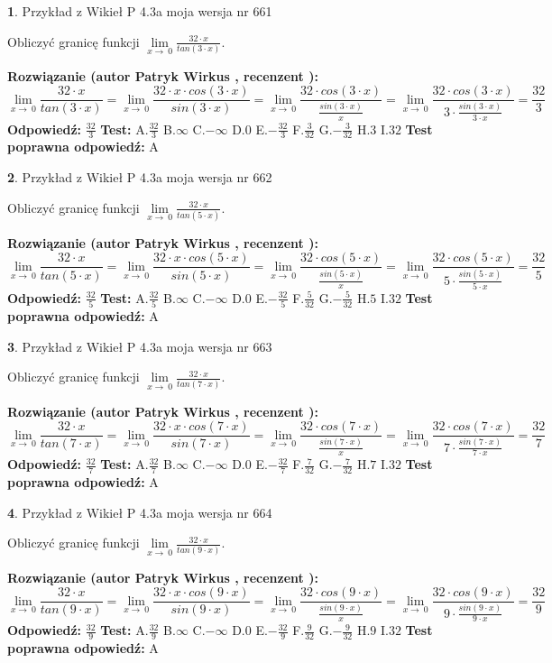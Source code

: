 \documentclass[12pt, a4paper]{article}
\theoremstyle{definition} %
\newtheorem{zad}{}
\newcommand{\zadStart}[1]{\begin{zad}#1\newline}
\newcommand{\zadStop}{\end{zad}}
\newcommand{\rozwStart}[2]{\noindent \textbf{Rozwiązanie (autor #1 , recenzent #2): }\newline}
\newcommand{\rozwStop}{\newline}
\newcommand{\odpStart}{\noindent \textbf{Odpowiedź:}\newline}
\newcommand{\odpStop}{\newline}
\newcommand{\testStart}{\noindent \textbf{Test:}\newline}
\newcommand{\testStop}{\newline}
\newcommand{\kluczStart}{\noindent \textbf{Test poprawna odpowiedź:}\newline}
\newcommand{\kluczStop}{\newline}
\begin{document}
\zadStart{Przykład z Wikieł P 4.3a moja wersja nr 661}


Obliczyć granicę funkcji $\lim\limits_{x\to\ 0}\frac{32 \cdot x}{tan(3 \cdot x)}$.
\zadStop
\rozwStart{Patryk Wirkus}{}
$$\lim\limits_{x\to\ 0}\frac{32 \cdot x}{tan(3 \cdot x)}=\lim\limits_{x\to\ 0}\frac{32 \cdot x \cdot cos(3 \cdot x)}{sin(3 \cdot x)}=\lim\limits_{x\to\ 0}\frac{32 \cdot cos(3 \cdot x)}{\frac{sin(3 \cdot x)}{x}}=\lim\limits_{x\to\ 0}\frac{32 \cdot cos(3 \cdot x)}{3 \cdot \frac{sin(3 \cdot x)}{3 \cdot x}} = \frac{32}{3}$$
\rozwStop
\odpStart
$\frac{32}{3}$
\odpStop
\testStart
A.$\frac{32}{3}$
B.$\infty$
C.$-\infty$
D.$0$
E.$-\frac{32}{3}$
F.$\frac{3}{32}$
G.$-\frac{3}{32}$
H.$3$
I.$32$
\testStop
\kluczStart
A
\kluczStop



\zadStart{Przykład z Wikieł P 4.3a moja wersja nr 662}


Obliczyć granicę funkcji $\lim\limits_{x\to\ 0}\frac{32 \cdot x}{tan(5 \cdot x)}$.
\zadStop
\rozwStart{Patryk Wirkus}{}
$$\lim\limits_{x\to\ 0}\frac{32 \cdot x}{tan(5 \cdot x)}=\lim\limits_{x\to\ 0}\frac{32 \cdot x \cdot cos(5 \cdot x)}{sin(5 \cdot x)}=\lim\limits_{x\to\ 0}\frac{32 \cdot cos(5 \cdot x)}{\frac{sin(5 \cdot x)}{x}}=\lim\limits_{x\to\ 0}\frac{32 \cdot cos(5 \cdot x)}{5 \cdot \frac{sin(5 \cdot x)}{5 \cdot x}} = \frac{32}{5}$$
\rozwStop
\odpStart
$\frac{32}{5}$
\odpStop
\testStart
A.$\frac{32}{5}$
B.$\infty$
C.$-\infty$
D.$0$
E.$-\frac{32}{5}$
F.$\frac{5}{32}$
G.$-\frac{5}{32}$
H.$5$
I.$32$
\testStop
\kluczStart
A
\kluczStop



\zadStart{Przykład z Wikieł P 4.3a moja wersja nr 663}


Obliczyć granicę funkcji $\lim\limits_{x\to\ 0}\frac{32 \cdot x}{tan(7 \cdot x)}$.
\zadStop
\rozwStart{Patryk Wirkus}{}
$$\lim\limits_{x\to\ 0}\frac{32 \cdot x}{tan(7 \cdot x)}=\lim\limits_{x\to\ 0}\frac{32 \cdot x \cdot cos(7 \cdot x)}{sin(7 \cdot x)}=\lim\limits_{x\to\ 0}\frac{32 \cdot cos(7 \cdot x)}{\frac{sin(7 \cdot x)}{x}}=\lim\limits_{x\to\ 0}\frac{32 \cdot cos(7 \cdot x)}{7 \cdot \frac{sin(7 \cdot x)}{7 \cdot x}} = \frac{32}{7}$$
\rozwStop
\odpStart
$\frac{32}{7}$
\odpStop
\testStart
A.$\frac{32}{7}$
B.$\infty$
C.$-\infty$
D.$0$
E.$-\frac{32}{7}$
F.$\frac{7}{32}$
G.$-\frac{7}{32}$
H.$7$
I.$32$
\testStop
\kluczStart
A
\kluczStop



\zadStart{Przykład z Wikieł P 4.3a moja wersja nr 664}


Obliczyć granicę funkcji $\lim\limits_{x\to\ 0}\frac{32 \cdot x}{tan(9 \cdot x)}$.
\zadStop
\rozwStart{Patryk Wirkus}{}
$$\lim\limits_{x\to\ 0}\frac{32 \cdot x}{tan(9 \cdot x)}=\lim\limits_{x\to\ 0}\frac{32 \cdot x \cdot cos(9 \cdot x)}{sin(9 \cdot x)}=\lim\limits_{x\to\ 0}\frac{32 \cdot cos(9 \cdot x)}{\frac{sin(9 \cdot x)}{x}}=\lim\limits_{x\to\ 0}\frac{32 \cdot cos(9 \cdot x)}{9 \cdot \frac{sin(9 \cdot x)}{9 \cdot x}} = \frac{32}{9}$$
\rozwStop
\odpStart
$\frac{32}{9}$
\odpStop
\testStart
A.$\frac{32}{9}$
B.$\infty$
C.$-\infty$
D.$0$
E.$-\frac{32}{9}$
F.$\frac{9}{32}$
G.$-\frac{9}{32}$
H.$9$
I.$32$
\testStop
\kluczStart
A
\kluczStop
\end{document}
